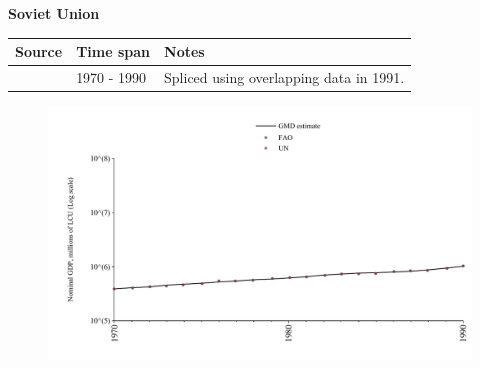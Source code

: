 \documentclass[12pt,a4paper,landscape]{article}
\begin{document}
\begin{adjustbox}{max totalsize={\paperwidth}{\paperheight},center}
\begin{minipage}[t][\textheight][t]{\textwidth}
\vspace*{0.5cm}
{}
\begin{center}
{\Large\bfseries Soviet Union}
\end{center}
\vspace{0.5cm}
\begin{table}[H]
\centering
\small
\begin{tabular}{|l|l|l|}
\hline
\textbf{Source} & \textbf{Time span} & \textbf{Notes} \\
\hline
\rowcolor{white}\cite{UN}& 1970 - 1990 &Spliced using overlapping data in 1991.\\
\hline
\end{tabular}
\end{table}
\begin{figure}[H]
\centering
\includegraphics[width=\textwidth,height=0.6\textheight,keepaspectratio]{graphs/SUN_nGDP.pdf}
\end{figure}
\end{minipage}
\end{adjustbox}
\end{document}

